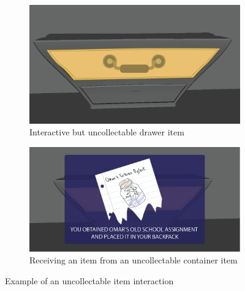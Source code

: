 \begin{figure}[H]
	\centering\begin{subfigure}{.45\textwidth}
		\centering
        \includegraphics[width=.9\linewidth]{images/container_1}
    	\caption{Interactive but uncollectable drawer item}
    	\label{fig:uncollectable drawer}
    \end{subfigure}
	\begin{subfigure}{.45\textwidth}
		\centering
        \includegraphics[width=.9\linewidth]{images/container_2}
    	\caption{Receiving an item from an uncollectable container item}
    	\label{fig:receive item}
    \end{subfigure}
    \caption{Example of an uncollectable item interaction}
    \label{fig:uncollectable}
\end{figure}